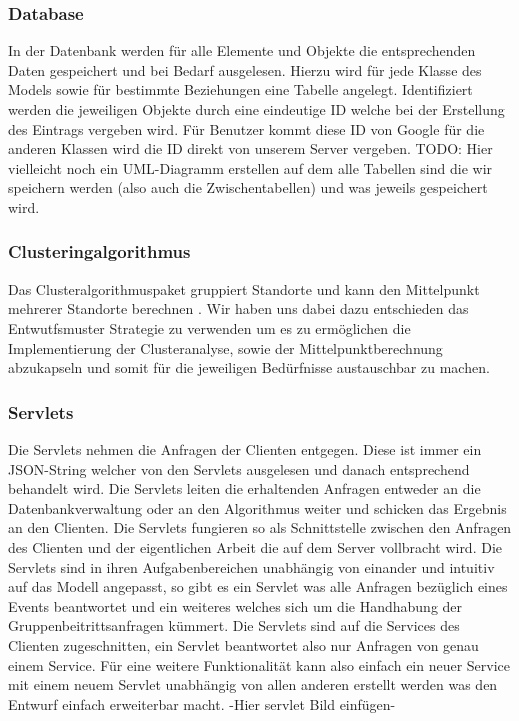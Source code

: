 \documentclass{scrartcl}
\begin{document}
	\subsubsection{Database}
	In der Datenbank werden für alle Elemente und Objekte die entsprechenden Daten gespeichert und bei Bedarf ausgelesen. Hierzu wird für jede Klasse des Models sowie für bestimmte Beziehungen eine Tabelle angelegt.
Identifiziert werden die jeweiligen Objekte durch eine eindeutige ID welche bei der Erstellung des Eintrags vergeben wird.
Für Benutzer kommt diese ID von Google für die anderen Klassen wird die ID direkt von unserem Server vergeben.
TODO: Hier vielleicht noch ein UML-Diagramm erstellen auf dem alle Tabellen sind die wir speichern werden (also auch die Zwischentabellen) und was jeweils gespeichert wird.

	\subsubsection{Clusteringalgorithmus}
	Das Clusteralgorithmuspaket gruppiert Standorte und kann den Mittelpunkt mehrerer Standorte berechnen . Wir haben uns dabei dazu entschieden das Entwutfsmuster Strategie zu verwenden um es zu ermöglichen die Implementierung der Clusteranalyse, sowie der Mittelpunktberechnung abzukapseln und somit für die jeweiligen Bedürfnisse austauschbar zu machen.

	\subsubsection{Servlets}
	Die Servlets nehmen die Anfragen der Clienten entgegen. Diese ist immer ein JSON-String welcher von den Servlets ausgelesen und danach entsprechend behandelt wird. Die Servlets leiten die erhaltenden Anfragen entweder an die Datenbankverwaltung oder an den Algorithmus weiter und schicken das Ergebnis an den Clienten.
Die Servlets fungieren so als Schnittstelle zwischen den Anfragen des Clienten und der eigentlichen Arbeit die auf dem Server vollbracht wird. 
Die Servlets sind in ihren Aufgabenbereichen unabhängig von einander und intuitiv auf das Modell angepasst, so gibt es ein Servlet was alle Anfragen bezüglich eines Events beantwortet und ein weiteres welches sich um die Handhabung der Gruppenbeitrittsanfragen kümmert.
Die Servlets sind auf die Services des Clienten zugeschnitten, ein Servlet beantwortet also nur Anfragen von genau einem Service.
Für eine weitere Funktionalität kann also einfach ein neuer Service mit einem neuem Servlet unabhängig von allen anderen erstellt werden was den Entwurf einfach erweiterbar macht.   
-Hier servlet Bild einfügen-
\end{document}

